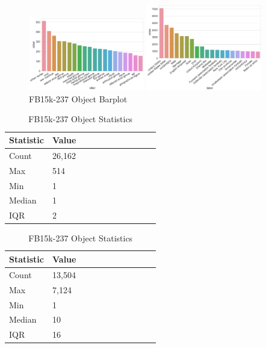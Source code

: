 
\begin{figure}[H]
	\parbox{.5\linewidth}{
   		\caption{WN18RR Object Barplot}
   		\centering
    		\includegraphics[width=0.45\textwidth, height=0.2\textheight]{WN18RR_Object_Counts}
		}
	\hfill
	\parbox{.5\linewidth}{
		\caption{FB15k-237 Object Barplot}
   		\centering
		\includegraphics[width=0.45\textwidth, height=0.2\textheight]{FB15k-237_Object_Counts}
		}
\end{figure}


\begin{table}[H]
	\parbox{.5\linewidth}{
		\caption{WN18RR Object Statistics}
		\centering
		\begin{tabular}{lllllllllll}
  			\textbf{Statistic} & \textbf{Value}  \\
  			\hline
			Count & 26,162 \\
			Max & 514 \\
			Min & 1 \\
  			Median & 1 \\
  			IQR & 2 \\
		\end{tabular}
		}
	\hfill
	\parbox{.5\linewidth}{
		\caption{FB15k-237 Object Statistics}
		\centering
		\begin{tabular}{lllllllllll}
  			\textbf{Statistic} & \textbf{Value}  \\
  			\hline
			Count & 13,504 \\
			Max & 7,124 \\
			Min & 1 \\
  			Median & 10 \\
  			IQR & 16 \\
		\end{tabular}
		}
\end{table}

